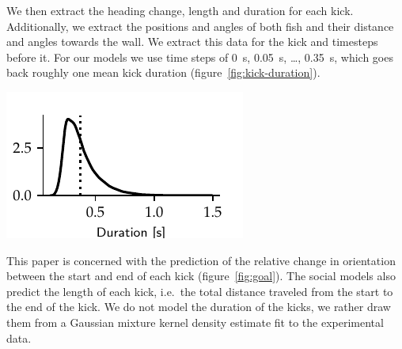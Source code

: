 \documentclass[nobib, a4paper]{tufte-handout}
\begin{document}
We then extract the heading change, length and duration for each kick.
Additionally, we extract the positions and angles of both fish and their distance and angles towards the wall.
We extract this data for the kick and timesteps before it.
For our models we use time steps of \SI{0}{\s}, \SI{0.05}{s}, \ldots, \SI{0.35}{\s}, which goes back roughly one mean kick duration (figure~\ref{fig:kick-duration}).
\begin{marginfigure}
\includegraphics{kick_duration_margin}
\caption{Kernel density estimate of training kick duration.
Dotted line is the mean duration at \SI{0.37}{\s}.}
\label{fig:kick-duration}
\end{marginfigure}

This paper is concerned with the prediction of the relative change in orientation between the start and end of each kick (figure~\ref{fig:goal}).
The social models also predict the length of each kick, i.e.\ the total distance traveled from the start to the end of the kick.
We do not model the duration of the kicks, we rather draw them from a Gaussian mixture kernel density estimate fit to the experimental data.
\end{document}
